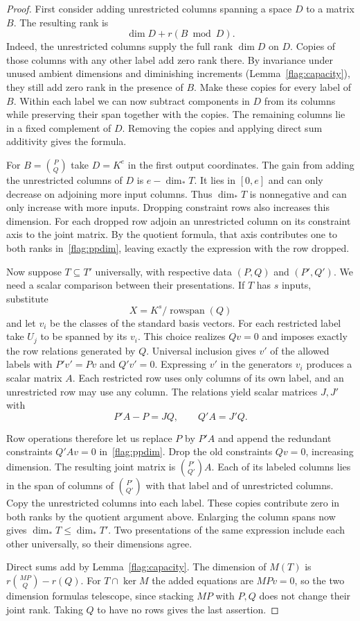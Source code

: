 \begin{proof}
First consider adding unrestricted columns spanning a space $D$ to a
matrix $B$. The resulting rank is
\[
 \dim D+r(B\bmod D).
\]
Indeed, the unrestricted columns supply the full rank $\dim D$ on $D$.
Copies of those columns with any other label add zero rank there. By
invariance under unused ambient dimensions and diminishing increments
(Lemma~\ref{flag:capacity}), they still add zero rank in the presence of
$B$. Make these copies for every label of $B$. Within each label we can
now subtract components in $D$ from its columns while preserving their
span together with the copies. The remaining columns lie in a fixed
complement of $D$. Removing the copies and applying direct sum
additivity gives the formula.

For $B=\binom{P}{Q}$ take $D=K^e$ in the first output coordinates. The
gain from adding the unrestricted columns of $D$ is $e-\dim_*T$. It
lies in $[0,e]$ and can only decrease on adjoining more input columns.
Thus $\dim_*T$ is nonnegative and can only increase with more inputs.
Dropping constraint rows also increases this dimension. For each
dropped row adjoin an unrestricted column on its constraint axis to
the joint matrix. By the quotient formula, that axis contributes one
to both ranks in~\eqref{flag:ppdim}, leaving exactly the expression
with the row dropped.

Now suppose $T\subseteq T'$ universally, with respective data
$(P,Q)$ and $(P',Q')$. We need a scalar comparison between their
presentations. If $T$ has $s$ inputs, substitute
\[
 X=K^s/\operatorname{rowspan}(Q)
\]
and let $v_i$ be the classes of the standard basis vectors. For each
restricted label take $U_j$ to be spanned by its $v_i$. This choice
realizes $Qv=0$ and imposes exactly the row relations generated by
$Q$. Universal inclusion gives $v'$ of the allowed labels with
$P'v'=Pv$ and $Q'v'=0$. Expressing $v'$ in the generators $v_i$
produces a scalar matrix $A$. Each restricted row uses only columns
of its own label, and an unrestricted row may use any column. The
relations yield scalar matrices $J,J'$ with
\[
 P'A-P=JQ,\qquad Q'A=J'Q.
\]

Row operations therefore let us replace $P$ by $P'A$ and append the
redundant constraints $Q'Av=0$ in~\eqref{flag:ppdim}. Drop the old
constraints $Qv=0$, increasing dimension. The resulting joint matrix
is $\binom{P'}{Q'}A$. Each of its labeled columns lies in the span of
columns of $\binom{P'}{Q'}$ with that label and of unrestricted
columns. Copy the unrestricted columns into each label. These copies
contribute zero in both ranks by the quotient argument above. Enlarging
the column spans now gives $\dim_*T\le\dim_*T'$. Two presentations of
the same expression include each other universally, so their dimensions
agree.

Direct sums add by Lemma~\ref{flag:capacity}. The dimension of $M(T)$ is
$r\binom{MP}{Q}-r(Q)$. For $T\cap\ker M$ the added equations are $MPv=0$,
so the two dimension formulas telescope, since stacking $MP$ with $P,Q$
does not change their joint rank. Taking $Q$ to have no rows gives the
last assertion.
\end{proof}

